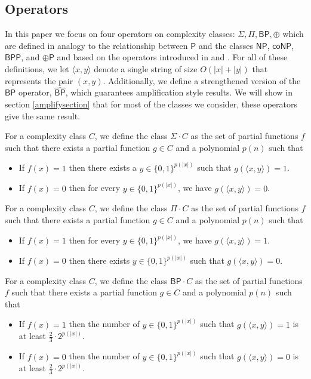 \documentclass[11pt]{article}
\newcommand{\bp}{\textsf{BP}}
\newcommand{\strongbp}{\widehat{\textsf{BP}}}
\newcommand{\bpp}{\textsf{BPP}}
\newcommand{\parity}{\oplus}
\newcommand{\p}{\textsf{P}}
\newcommand{\np}{\textsf{NP}}
\newcommand{\conp}{\textsf{coNP}}
\begin{document}
\subsection{Operators}

In this paper we focus on four operators on complexity classes: $\Sigma, \Pi, \bp, \parity$ which are defined in analogy to the relationship between $\p$ and the classes $\np$, $\conp$, $\bpp$, and $\parity\p$ and based on the operators introduced in \cite{Schoning} and \cite{Schoning2}. For all of these definitions, we let $\langle x, y\rangle$ denote a single string of size $O(|x| + |y|)$ that represents the pair $(x,y)$. Additionally, we define a strengthened version of the $\bp$ operator, $\strongbp$, which guarantees amplification style results. We will show in section \ref{amplifysection} that for most of the classes we consider, these operators give the same result.

\begin{definition}\label{opsigma}
For a complexity class $C$, we define the class $\Sigma \cdot C$ as the set of partial functions $f$ such that there exists a partial function $g \in C$ and a polynomial $p(n)$ such that
\begin{itemize}
\item If $f(x) = 1$ then there exists a $y \in \{0,1\}^{p(|x|)}$ such that $g(\langle x,y \rangle) = 1$.
\item If $f(x) = 0$ then for every $y \in \{0,1\}^{p(|x|)}$, we have $g(\langle x, y\rangle) = 0$.
\end{itemize}
\end{definition}

\begin{definition}\label{oppi}
For a complexity class $C$, we define the class $\Pi \cdot C$ as the set of partial functions $f$ such that there exists a partial function $g \in C$ and a polynomial $p(n)$ such that
\begin{itemize}
\item If $f(x) = 1$ then for every $y \in \{0,1\}^{p(|x|)}$, we have $g(\langle x,y \rangle) = 1$.
\item If $f(x) = 0$ then there exists $y \in \{0,1\}^{p(|x|)}$ such that $g(\langle x, y\rangle) = 0$.
\end{itemize}
\end{definition}

\begin{definition}\label{opbp}
For a complexity class $C$, we define the class $\bp\cdot C$ as the set of partial functions $f$ such that there exists a partial function $g \in C$ and a polynomial $p(n)$ such that
\begin{itemize}
\item If $f(x) = 1$ then the number of $y \in \{0,1\}^{p(|x|)}$ such that $g(\langle x, y\rangle) = 1$ is at least $\frac{2}{3}\cdot 2^{p(|x|)}$.
\item If $f(x) = 0$ then the number of $y \in \{0,1\}^{p(|x|)}$ such that $g(\langle x, y\rangle) = 0$ is at least $\frac{2}{3}\cdot 2^{p(|x|)}$.
\end{itemize}
\end{definition}
\end{document}
